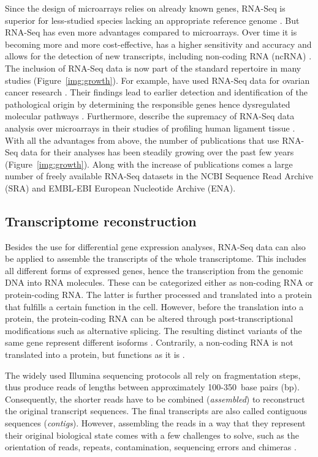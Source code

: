 \documentclass[12pt,a4paper,english]{article}
\begin{document}
    Since the design of microarrays relies on already known genes, RNA-Seq is superior for less-studied species lacking an appropriate reference genome \citep{rnaseq:09}. But RNA-Seq has even more advantages compared to microarrays. Over time it is becoming more and more cost-effective, has a higher sensitivity and accuracy and allows for the detection of new transcripts, including non-coding RNA (ncRNA) \citep{Rodriguez-Garcia:17}.
	The inclusion of RNA-Seq data is now part of the standard repertoire in many studies (Figure~\ref{img:growth}). For example, \citeauthor{Wang:19} have used RNA-Seq data for ovarian cancer research \citep{Wang:19}. Their findings lead to earlier detection and identification of the pathological origin by determining the responsible genes hence dysregulated molecular pathways \citep{Wang:19}.
	Furthermore, \citeauthor{Rai:18} describe the supremacy of RNA-Seq data analysis over microarrays in their studies of profiling human ligament tissue \citep{Rai:18}.
	With all the advantages from above, the number of publications that use RNA-Seq data for their analyses has been steadily growing over the past few years (Figure~\ref{img:growth}). Along with the increase of publications comes a large number of freely available RNA-Seq datasets in the NCBI Sequence Read Archive (SRA) and EMBL-EBI European Nucleotide Archive (ENA).


\subsection{Transcriptome reconstruction}
    Besides the use for differential gene expression analyses, RNA-Seq data can also be applied to assemble the transcripts of the whole transcriptome.
    This includes all different forms of expressed genes, hence the transcription from the genomic DNA into RNA molecules. These can be categorized either as non-coding RNA or protein-coding RNA. The latter is further processed and translated into a protein that fulfills a certain function in the cell. However, before the translation into a protein, the protein-coding RNA can be altered through post-transcriptional modifications such as alternative splicing. The resulting distinct variants of the same gene represent different isoforms \citep{splicing:03}. Contrarily, a non-coding RNA is not translated into a protein, but functions as it is \citep{ncRNA:05}.
    
    The widely used Illumina sequencing protocols all rely on fragmentation steps, thus produce reads of lengths between approximately 100-350~base pairs (bp). Consequently, the shorter reads have to be combined (\textit{assembled}) to reconstruct the original transcript sequences. The final transcripts are also called contiguous sequences (\textit{contigs}). However, assembling the reads in a way that they represent their original biological state comes with a few challenges to solve, such as the orientation of reads, repeats, contamination, sequencing errors and chimeras \citep{rev_rnaseq_problems:11}.
    
\end{document}
